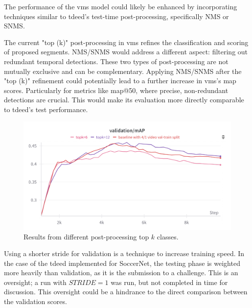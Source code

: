 The performance of the \acrshort{vms} model could likely be enhanced by incorporating techniques similar to \acrshort{tdeed}'s test-time post-processing, specifically NMS or SNMS.

The current "top (k)" post-processing in \acrshort{vms} refines the classification and scoring of proposed segments.
NMS/SNMS would address a different aspect: filtering out redundant temporal detections.
These two types of post-processing are not mutually exclusive and can be complementary. Applying NMS/SNMS after the "top (k)" refinement could potentially lead to a further increase in \acrshort{vms}'s \acrshort{map} scores. Particularly for metrics like \acrshort{map}@50, where precise, non-redundant detections are crucial. This would make its evaluation more directly comparable to \acrshort{tdeed}'s test performance.

\begin{figure}
    \centering
    \includegraphics[width=0.75\linewidth]{figures/topk_classes.png}
    \caption{Results from different post-processing top \(k\) classes.}
    \label{fig:topk}
\end{figure}

Using a shorter stride for validation is a technique to increase training speed. In the case of the \acrshort{tdeed} implemented for SoccerNet, the testing phase is weighted more heavily than validation, as it is the submission to a challenge. This is an oversight; a run with \(STRIDE=1\) was run, but not completed in time for discussion. This oversight could be a hindrance to the direct comparison between the validation scores.



